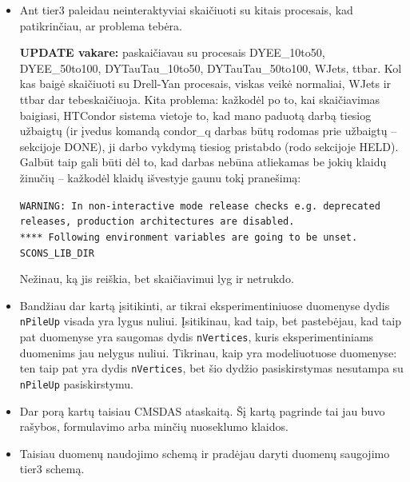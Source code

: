 \documentclass[a4paper, 12pt]{article}
\newcommand{\ttt}[1]{\texttt{#1}}
\begin{document}
\begin{itemize}
	\item Ant tier3 paleidau neinteraktyviai skaičiuoti su kitais procesais,
	kad patikrinčiau, ar problema tebėra.
	
	\textbf{UPDATE vakare:} paskaičiavau su procesais DYEE\_10to50, DYEE\_50to100,
	DYTauTau\_10to50, DYTauTau\_50to100, WJets, ttbar. Kol kas baigė skaičiuoti su
	Drell-Yan procesais, viskas veikė normaliai, WJets ir ttbar dar tebeskaičiuoja.
	Kita problema: kažkodėl po to, kai skaičiavimas baigiasi, HTCondor sistema vietoje
	to, kad mano paduotą darbą tiesiog užbaigtų (ir įvedus komandą condor\_q
	darbas būtų rodomas prie užbaigtų -- sekcijoje DONE), ji darbo vykdymą
	tiesiog pristabdo (rodo sekcijoje HELD). Galbūt taip gali būti dėl to,
	kad darbas nebūna atliekamas be jokių klaidų žinučių -- kažkodėl klaidų išvestyje
	gaunu tokį pranešimą:
	
	\ttt{WARNING: In non-interactive mode release checks e.g. deprecated releases,
	production architectures are disabled.\\
	**** Following environment variables are going to be unset.\\ SCONS\_LIB\_DIR}
	
	Nežinau, ką jis reiškia, bet skaičiavimui lyg ir netrukdo.
	\item Bandžiau dar kartą įsitikinti, ar tikrai eksperimentiniuose duomenyse
	dydis \ttt{nPileUp} visada yra lygus nuliui. Įsitikinau, kad taip, bet pastebėjau,
	kad taip pat duomenyse yra saugomas dydis \ttt{nVertices}, kuris eksperimentiniams
	duomenims jau nelygus nuliui. Tikrinau, kaip yra modeliuotuose duomenyse: ten taip
	pat yra dydis \ttt{nVertices}, bet šio dydžio pasiskirstymas nesutampa su
	\ttt{nPileUp} pasiskirstymu.
	\item Dar  porą kartų taisiau CMSDAS ataskaitą. Šį kartą pagrinde tai jau buvo rašybos, formulavimo
	arba minčių nuoseklumo klaidos.
	\item Taisiau duomenų naudojimo schemą ir pradėjau daryti duomenų saugojimo tier3 schemą.
\end{itemize}
\end{document}
